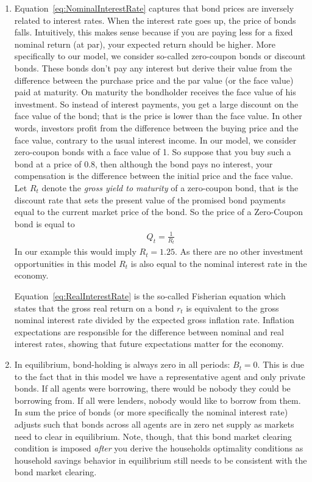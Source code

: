 \begin{enumerate}
\item Equation~\eqref{eq:NominalInterestRate} captures that bond prices are inversely related to interest rates.
When the interest rate goes up, the price of bonds falls.
Intuitively, this makes sense because if you are paying less for a fixed nominal return (at par),
  your expected return should be higher.
More specifically to our model, we consider so-called zero-coupon bonds or discount bonds.
These bonds don't pay any interest but derive their value from the difference between the purchase price and the par value (or the face value) paid at maturity.
On maturity the bondholder receives the face value of his investment.
So instead of interest payments, you get a large discount on the face value of the bond; that is the price is lower than the face value.
In other words, investors profit from the difference between the buying price and the face value, contrary to the usual interest income.
In our model, we consider zero-coupon bonds with a face value of 1.
So suppose that you buy such a bond at a price of 0.8, then although the bond pays no interest,
  your compensation is the difference between the initial price and the face value.
Let \(R_t\) denote the \emph{gross yield to maturity} of a zero-coupon bond,
  that is the discount rate that sets the present value of the promised bond payments equal to the current market price of the bond.
So the price of a Zero-Coupon bond is equal to
\begin{align*}
Q_t = \frac{1}{R_t}
\end{align*}
In our example this would imply \(R_t=1.25\).
As there are no other investment opportunities in this model \(R_t\) is also equal to the nominal interest rate in the economy.
	
Equation~\eqref{eq:RealInterestRate} is the so-called Fisherian equation
  which states that the gross real return on a bond \(r_t\) is equivalent to the gross nominal interest rate divided by the expected gross inflation rate.
Inflation expectations are responsible for the difference between nominal and real interest rates, showing that future expectations matter for the economy.

\item In equilibrium, bond-holding is always zero in all periods: \(B_t=0\).
This is due to the fact that in this model we have a representative agent and only private bonds.
If all agents were borrowing, there would be nobody they could be borrowing from.
If all were lenders, nobody would like to borrow from them.
In sum the price of bonds (or more specifically the nominal interest rate) adjusts such
  that bonds across all agents are in zero net supply as markets need to clear in equilibrium.
Note, though, that this bond market clearing condition is imposed \emph{after} you derive the households optimality conditions
  as household savings behavior in equilibrium still needs to be consistent with the bond market clearing.


\end{enumerate}
